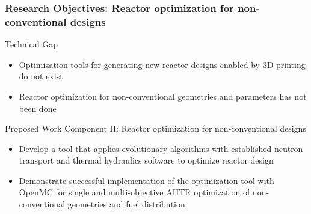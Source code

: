\begin{frame}
    \frametitle{Research Objectives: Reactor optimization for non-conventional designs}
    \begin{block}{Technical Gap}
      \begin{itemize}
        \item Optimization tools for generating new reactor designs enabled by
        3D printing do not exist
        \item Reactor optimization for non-conventional geometries and parameters 
        has not been done 
      \end{itemize}
    \end{block}
    \begin{block}{Proposed Work Component II: Reactor optimization for
      non-conventional designs}
        \begin{itemize}
            \item Develop a tool that applies evolutionary algorithms with established 
            neutron transport and thermal hydraulics software to optimize reactor 
            design
            \item Demonstrate successful implementation of the optimization tool 
            with OpenMC for single and multi-objective AHTR optimization of 
            non-conventional geometries and fuel distribution
        \end{itemize}
    \end{block}
  \end{frame}
